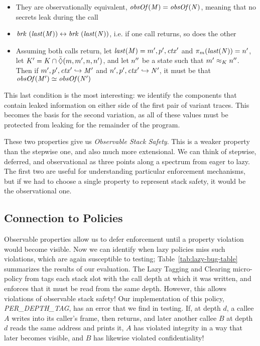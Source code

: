 \documentclass[acmsmall,review,anonymous]{acmart}\settopmatter{printfolios=true,printccs=false,printacmref=false}
\begin{document}
{{\begin{itemize}
\item They are observationally equivalent, \(\mathit{obsOf}(\mathit{M}) = \mathit{obsOf}(\mathit{N})\),
  meaning that no secrets leak during the call
\item \(\mathit{brk} ~ (\mathit{last}(\mathit{M})) \leftrightarrow \mathit{brk} ~
(\mathit{last}(\mathit{N}))\), i.e. if one call returns, so does the other
\item Assuming both calls return, let \(\mathit{last}(\mathit{M}) = m',p',\mathit{ctx}'\)
  and \(\pi_m(\mathit{last}(\mathit{N})) = n'\),
  let \(K' = K \cap \bar{\Diamond}(m,m',n,n')\),
  and let \(n''\) be a state such that \(m' \approx_K n''\).
  Then if \(m',p',\mathit{ctx}' \hookrightarrow \mathit{M}'\) and
  \(n',p',\mathit{ctx}' \hookrightarrow \mathit{N}'\), it must be
  that \(\mathit{obsOf}(\mathit{M}') \simeq \mathit{obsOf}(\mathit{N}')\)
\end{itemize}

This last condition is the most interesting: we identify the components that
contain leaked information on either side of the first pair of variant traces.
This becomes the basis for the second variation, as all of these values
must be protected from leaking for the remainder of the program.

These two properties give us
{\em Observable Stack Safety}. This is a weaker property
than the stepwise one, and also much more extensional.
We can think of stepwise, deferred, and observational as
three points along a spectrum from eager to lazy. The first two
are useful for understanding particular enforcement mechanisms,
but if we had to choose a single property to represent stack safety,
it would be the observational one.

\subsection{Connection to Policies}

Observable properties allow us to defer enforcement until a property
violation would become visible. Now we can identify when lazy policies
miss such violations, which are again susceptible to testing;
Table~\ref{tab:lazy-bug-table} summarizes the results of our evaluation.
The Lazy Tagging and Clearing
micro-policy from \citet{DBLP:conf/sp/RoesslerD18} tags each stack slot with the call depth
at which it was written, and enforces that it must be read from the
same depth. However, this allows violations of observable stack safety!
Our implementation of this policy, {\em PER\_DEPTH\_TAG}, has an error that we find
in testing. If, at depth \(d\), a callee \(A\) writes into its caller's
frame, then returns, and later another callee \(B\) at depth \(d\) reads the same
address and prints it, \(A\) has violated integrity in a way that later becomes visible,
and \(B\) has likewise violated confidentiality!

}}
\end{document}
